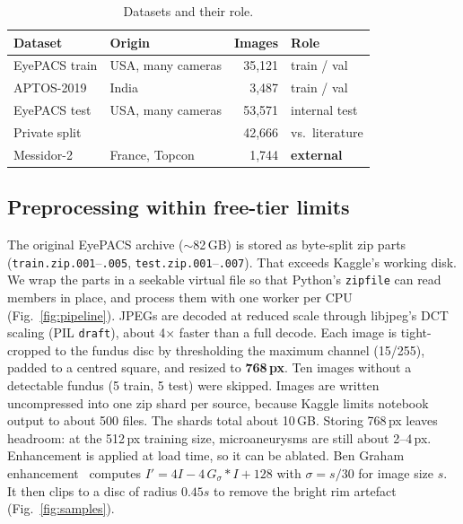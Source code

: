 \documentclass[conference,a4paper]{IEEEtran}
\begin{document}
\begin{table}[t]
\centering\caption{Datasets and their role.}\label{tab:data}
\footnotesize
\begin{tabular}{@{}llrl@{}}
\toprule
Dataset & Origin & Images & Role\\
\midrule
EyePACS train & USA, many cameras & 35,121 & train / val\\
APTOS-2019 & India & 3,487 & train / val\\
EyePACS test & USA, many cameras & 53,571 & internal test\\
\quad Private split & & 42,666 & vs.\ literature\\
Messidor-2 & France, Topcon & 1,744 & \textbf{external}\\
\bottomrule
\end{tabular}
\end{table}

\subsection{Preprocessing within free-tier limits}
The original EyePACS archive ($\sim$82\,GB) is stored as byte-split zip parts (\texttt{train.zip.001}--\texttt{.005}, \texttt{test.zip.001}--\texttt{.007}). That exceeds Kaggle's working disk.
We wrap the parts in a seekable virtual file so that Python's \texttt{zipfile} can read members in place, and process them with one worker per CPU (Fig.~\ref{fig:pipeline}).
JPEGs are decoded at reduced scale through libjpeg's DCT scaling (PIL \texttt{draft}), about 4$\times$ faster than a full decode.
Each image is tight-cropped to the fundus disc by thresholding the maximum channel (15/255), padded to a centred square, and resized to \textbf{768\,px}.
Ten images without a detectable fundus (5 train, 5 test) were skipped.
Images are written uncompressed into one zip shard per source, because Kaggle limits notebook output to about 500 files. The shards total about 10\,GB.
Storing 768\,px leaves headroom: at the 512\,px training size, microaneurysms are still about 2--4\,px.
Enhancement is applied at load time, so it can be ablated.
Ben Graham enhancement~\cite{graham} computes $I' = 4I - 4\,G_{\sigma}*I + 128$ with $\sigma = s/30$ for image size $s$. It then clips to a disc of radius $0.45s$ to remove the bright rim artefact (Fig.~\ref{fig:samples}).
\end{document}
